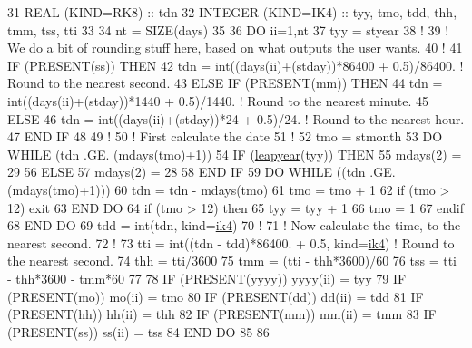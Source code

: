 \begin{DoxyCode}
31 \textcolor{keywordtype}{REAL (KIND=RK8)}                                         :: tdn
32 \textcolor{keywordtype}{INTEGER (KIND=IK4)}                                      :: tyy, tmo, tdd, thh, tmm, tss, tti
33 
34 nt  = \textcolor{keyword}{SIZE}(days)
35 
36 \textcolor{keywordflow}{DO} ii=1,nt
37     tyy = styear
38     \textcolor{comment}{!}
39     \textcolor{comment}{! We do a bit of rounding stuff here, based on what outputs the user wants.}
40     \textcolor{comment}{!}
41     \textcolor{keywordflow}{IF} (\textcolor{keyword}{PRESENT}(ss)) \textcolor{keywordflow}{THEN}
42         tdn = int((days(ii)+(stday))*86400 + 0.5)/86400.      \textcolor{comment}{! Round to the nearest second.}
43     \textcolor{keywordflow}{ELSE} \textcolor{keywordflow}{IF} (\textcolor{keyword}{PRESENT}(mm)) \textcolor{keywordflow}{THEN}
44         tdn = int((days(ii)+(stday))*1440 + 0.5)/1440.        \textcolor{comment}{! Round to the nearest minute.}
45     \textcolor{keywordflow}{ELSE}
46         tdn = int((days(ii)+(stday))*24 + 0.5)/24.            \textcolor{comment}{! Round to the nearest hour.}
47 \textcolor{keywordflow}{    END IF}
48 
49     \textcolor{comment}{!}
50     \textcolor{comment}{! First calculate the date}
51     \textcolor{comment}{!}
52     tmo = stmonth
53     \textcolor{keywordflow}{DO} \textcolor{keywordflow}{WHILE} (tdn .GE. (mdays(tmo)+1))
54         \textcolor{keywordflow}{IF} (\hyperlink{namespacetime_ac7f82d40fd2b49e7e9025b103e88555c}{leapyear}(tyy)) \textcolor{keywordflow}{THEN}
55             mdays(2) = 29
56         \textcolor{keywordflow}{ELSE}
57             mdays(2) = 28
58 \textcolor{keywordflow}{        END IF}
59         \textcolor{keywordflow}{DO} \textcolor{keywordflow}{WHILE} ((tdn .GE. (mdays(tmo)+1)))
60             tdn = tdn - mdays(tmo)
61             tmo = tmo + 1
62             \textcolor{keywordflow}{if} (tmo > 12) \textcolor{keywordflow}{exit}
63 \textcolor{keywordflow}{        END DO}
64         \textcolor{keywordflow}{if} (tmo > 12) \textcolor{keywordflow}{then}
65             tyy = tyy + 1
66             tmo = 1
67 \textcolor{keywordflow}{       endif}
68 \textcolor{keywordflow}{    END DO}
69     tdd = int(tdn, kind=\hyperlink{namespaceportable_aa110cf333432508140602ea192c4b2ea}{ik4})
70     \textcolor{comment}{!}
71     \textcolor{comment}{! Now calculate the time, to the nearest second.}
72     \textcolor{comment}{!}
73     tti = int((tdn - tdd)*86400. + 0.5, kind=\hyperlink{namespaceportable_aa110cf333432508140602ea192c4b2ea}{ik4})     \textcolor{comment}{! Round to the nearest second.}
74     thh = tti/3600
75     tmm = (tti - thh*3600)/60
76     tss = tti - thh*3600 - tmm*60
77 
78     \textcolor{keywordflow}{IF} (\textcolor{keyword}{PRESENT}(yyyy))  yyyy(ii)    = tyy
79     \textcolor{keywordflow}{IF} (\textcolor{keyword}{PRESENT}(mo))    mo(ii)      = tmo
80     \textcolor{keywordflow}{IF} (\textcolor{keyword}{PRESENT}(dd))    dd(ii)      = tdd
81     \textcolor{keywordflow}{IF} (\textcolor{keyword}{PRESENT}(hh))    hh(ii)      = thh
82     \textcolor{keywordflow}{IF} (\textcolor{keyword}{PRESENT}(mm))    mm(ii)      = tmm
83     \textcolor{keywordflow}{IF} (\textcolor{keyword}{PRESENT}(ss))    ss(ii)      = tss
84 \textcolor{keywordflow}{END DO}
85     
86 
\end{DoxyCode}


